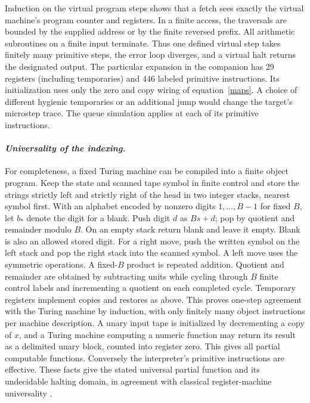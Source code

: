 Induction on the virtual program steps shows that a fetch sees exactly the virtual machine's program counter and registers. In a finite access, the traversals are bounded by the supplied address or by the finite reversed prefix. All arithmetic subroutines on a finite input terminate. Thus one defined virtual step takes finitely many primitive steps, the error loop diverges, and a virtual halt returns the designated output. The particular expansion in the companion has 29 registers (including temporaries) and 446 labeled primitive instructions. Its initialization uses only the zero and copy wiring of equation~\eqref{maps}. A choice of different hygienic temporaries or an additional jump would change the target's microstep trace. The queue simulation applies at each of its primitive instructions.

\paragraph{\textit{Universality of the indexing.}}
For completeness, a fixed Turing machine can be compiled into a finite object program. Keep the state and scanned tape symbol in finite control and store the strings strictly left and strictly right of the head in two integer stacks, nearest symbol first. With an alphabet encoded by nonzero digits \(1,\ldots,B-1\) for fixed \(B\), let \(b_\ast\) denote the digit for a blank. Push digit \(d\) as \(Bs+d\); pop by quotient and remainder modulo \(B\). On an empty stack return blank and leave it empty. Blank is also an allowed stored digit. For a right move, push the written symbol on the left stack and pop the right stack into the scanned symbol. A left move uses the symmetric operations. A fixed-\(B\) product is repeated addition. Quotient and remainder are obtained by subtracting units while cycling through \(B\) finite control labels and incrementing a quotient on each completed cycle. Temporary registers implement copies and restores as above. This proves one-step agreement with the Turing machine by induction, with only finitely many object instructions per machine description. A unary input tape is initialized by decrementing a copy of \(x\), and a Turing machine computing a numeric function may return its result as a delimited unary block, counted into register zero. This gives all partial computable functions. Conversely the interpreter's primitive instructions are effective. These facts give the stated universal partial function and its undecidable halting domain, in agreement with classical register-machine universality \cite{register}.
